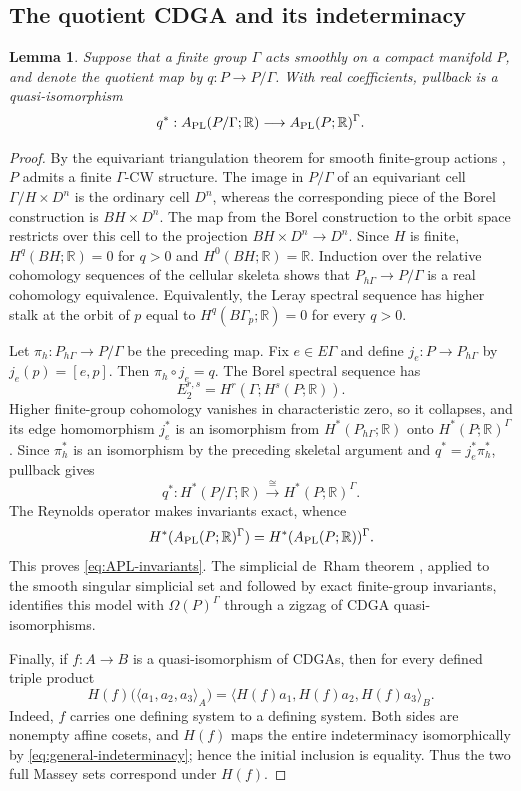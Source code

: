 \documentclass[11pt]{article}
\newtheorem{lemma}[theorem]{Lemma}
\theoremstyle{remark}\newtheorem{remark}[theorem]{Remark}
\newcommand{\R}{\mathbb R}
\begin{document}
\subsection{The quotient CDGA and its indeterminacy}
\begin{lemma}\label{lem:finite-quotient-CDGA}
Suppose that a finite group $\Gamma$ acts smoothly on a compact manifold
$P$, and denote the quotient map by $q:P\to P/\Gamma$.  With real coefficients,
pullback is a quasi-isomorphism
\begin{equation}\label{eq:APL-invariants}
q^*:A_{\rm PL}(P/\Gamma;\R)\longrightarrow
A_{\rm PL}(P;\R)^\Gamma.
\end{equation}
\end{lemma}
\begin{proof}
By the equivariant triangulation theorem for smooth finite-group actions
\cite{Illman},
$P$ admits a finite $\Gamma$-CW structure.  The image in $P/\Gamma$ of an
equivariant cell $\Gamma/H\times D^n$ is the ordinary cell $D^n$, whereas
the corresponding piece of the Borel construction is $BH\times D^n$.
The map from the Borel construction to the orbit space restricts over this
cell to the projection $BH\times D^n\to D^n$.  Since $H$ is finite,
$H^q(BH;\R)=0$ for $q>0$ and $H^0(BH;\R)=\R$.  Induction over the relative
cohomology sequences of the cellular skeleta shows that
$P_{h\Gamma}\to P/\Gamma$ is a real cohomology equivalence.  Equivalently,
the Leray spectral sequence has higher stalk at the orbit of $p$ equal to
$H^q(B\Gamma_p;\R)=0$ for every $q>0$.

Let $\pi_h:P_{h\Gamma}\to P/\Gamma$ be the preceding map.  Fix
$e\in E\Gamma$ and define $j_e:P\to P_{h\Gamma}$ by
$j_e(p)=[e,p]$.  Then $\pi_h\circ j_e=q$.  The Borel spectral sequence has
\[
E_2^{r,s}=H^r(\Gamma;H^s(P;\R)).
\]
Higher finite-group cohomology vanishes in characteristic zero, so it
collapses, and its edge homomorphism $j_e^*$ is an isomorphism from
$H^*(P_{h\Gamma};\R)$ onto $H^*(P;\R)^\Gamma$.  Since $\pi_h^*$ is an
isomorphism by the preceding skeletal argument and
$q^*=j_e^*\pi_h^*$, pullback gives
\[
q^*:H^*(P/\Gamma;\R)\xrightarrow{\ \cong\ }H^*(P;\R)^\Gamma.
\]
The Reynolds operator makes invariants exact, whence
\[
H^*(A_{\rm PL}(P;\R)^\Gamma)=H^*(A_{\rm PL}(P;\R))^\Gamma.
\]
This proves \eqref{eq:APL-invariants}.  The simplicial de~Rham theorem
\cite{BG,Dupont}, applied to the
smooth singular simplicial set and followed by exact finite-group
invariants, identifies this model with $\Omega(P)^\Gamma$ through a
zigzag of CDGA quasi-isomorphisms.

Finally, if $f:A\to B$ is a quasi-isomorphism of CDGAs, then for every
defined triple product
\[
H(f)\bigl(\langle a_1,a_2,a_3\rangle_A\bigr)
=\langle H(f)a_1,H(f)a_2,H(f)a_3\rangle_B.
\]
Indeed, $f$ carries one defining system to a defining system.  Both sides
are nonempty affine cosets, and $H(f)$ maps the entire indeterminacy
isomorphically by \eqref{eq:general-indeterminacy}; hence the initial
inclusion is equality.  Thus the two full Massey sets correspond under
$H(f)$.
\end{proof}
\end{document}
